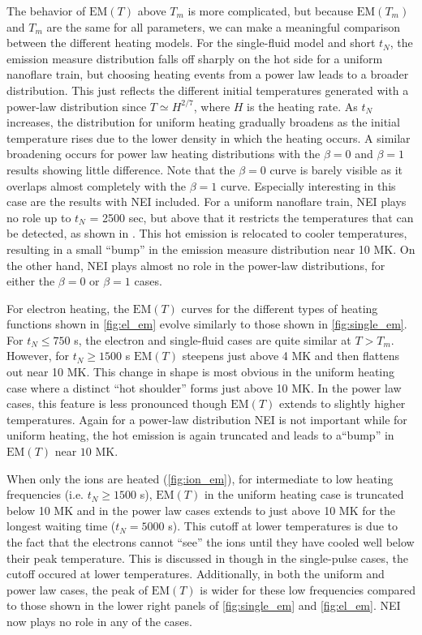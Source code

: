 \documentclass[preprint]{aastex}
\begin{document}
	\par The behavior of $\mathrm{EM}(T)$ above $T_m$ is more complicated, but because $\mathrm{EM}(T_m)$ and $T_m$ are the same for all parameters, we can make a meaningful comparison between the different heating models. For the single-fluid model and short $t_N$, the emission measure distribution falls off sharply on the hot side for a uniform nanoflare train, but choosing heating events from a power law leads to a broader distribution. This just reflects the different initial temperatures generated with a power-law distribution since $T \simeq H^{2/7}$, where $H$ is the heating rate. As $t_N$ increases, the distribution for uniform heating gradually broadens as the initial temperature rises due to the lower density in which the heating occurs. A similar broadening occurs for power law heating distributions with the $\beta=0$ and $\beta=1$ results showing little difference. Note that the $\beta=0$ curve is barely visible as it overlaps almost completely with the $\beta=1$ curve. Especially interesting in this case are the results with NEI included. For a uniform nanoflare train, NEI plays no role up to $t_N$ = 2500 sec, but above that it restricts the temperatures that can be detected, as shown in . This hot emission is relocated to cooler temperatures, resulting in a small ``bump'' in the emission measure distribution near 10 MK. On the other hand, NEI plays almost no role in the power-law distributions, for either the $\beta=0$ or $\beta=1$ cases.
	\par For electron heating, the $\mathrm{EM}(T)$ curves for the different types of heating functions shown in \autoref{fig:el_em} evolve similarly to those shown in \autoref{fig:single_em}. For $t_N\le750$ s, the electron and single-fluid cases are quite similar at $T>T_m$. However, for $t_N\ge1500$ s $\mathrm{EM}(T)$ steepens just above 4 MK and then flattens out near 10 MK. This change in shape is most obvious in the uniform heating case where a distinct ``hot shoulder'' forms just above 10 MK. In the power law cases, this feature is less pronounced though $\mathrm{EM}(T)$ extends to slightly higher temperatures. Again for a power-law distribution NEI is not important while for uniform heating, the hot emission is again truncated and leads to a``bump'' in $\mathrm{EM}(T)$ near $10$ MK.
	\par When only the ions are heated (\autoref{fig:ion_em}), for intermediate to low heating frequencies (i.e. $t_N\ge1500$ s), $\mathrm{EM}(T)$ in the uniform heating case is truncated below 10 MK and in the power law cases extends to just above 10 MK for the longest waiting time ($t_N=5000$ s). This cutoff at lower temperatures is due to the fact that the electrons cannot ``see'' the ions until they have cooled well below their peak temperature. This is discussed in  though in the single-pulse cases, the cutoff occured at lower temperatures. Additionally, in both the uniform and power law cases, the peak of $\mathrm{EM}(T)$ is wider for these low frequencies compared to those shown in the lower right panels of \autoref{fig:single_em} and \autoref{fig:el_em}. NEI now plays no role in any of the cases.
\end{document}

